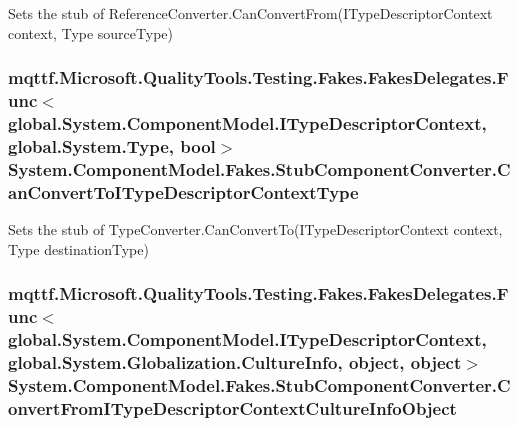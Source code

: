 Sets the stub of Reference\-Converter.\-Can\-Convert\-From(\-I\-Type\-Descriptor\-Context context, Type source\-Type)

\hypertarget{class_system_1_1_component_model_1_1_fakes_1_1_stub_component_converter_a55169fcd890409ab72d52d56fff39c34}{
\subsubsection[{Can\-Convert\-To\-I\-Type\-Descriptor\-Context\-Type}]{\setlength{\rightskip}{0pt plus 5cm}mqttf.\-Microsoft.\-Quality\-Tools.\-Testing.\-Fakes.\-Fakes\-Delegates.\-Func$<$global.\-System.\-Component\-Model.\-I\-Type\-Descriptor\-Context, global.\-System.\-Type, bool$>$ System.\-Component\-Model.\-Fakes.\-Stub\-Component\-Converter.\-Can\-Convert\-To\-I\-Type\-Descriptor\-Context\-Type}}\label{class_system_1_1_component_model_1_1_fakes_1_1_stub_component_converter_a55169fcd890409ab72d52d56fff39c34}


Sets the stub of Type\-Converter.\-Can\-Convert\-To(\-I\-Type\-Descriptor\-Context context, Type destination\-Type)

\hypertarget{class_system_1_1_component_model_1_1_fakes_1_1_stub_component_converter_a99bc66bd0a84e78e801b95b2952d9614}{
\subsubsection[{Convert\-From\-I\-Type\-Descriptor\-Context\-Culture\-Info\-Object}]{\setlength{\rightskip}{0pt plus 5cm}mqttf.\-Microsoft.\-Quality\-Tools.\-Testing.\-Fakes.\-Fakes\-Delegates.\-Func$<$global.\-System.\-Component\-Model.\-I\-Type\-Descriptor\-Context, global.\-System.\-Globalization.\-Culture\-Info, object, object$>$ System.\-Component\-Model.\-Fakes.\-Stub\-Component\-Converter.\-Convert\-From\-I\-Type\-Descriptor\-Context\-Culture\-Info\-Object}}\label{class_system_1_1_component_model_1_1_fakes_1_1_stub_component_converter_a99bc66bd0a84e78e801b95b2952d9614}


